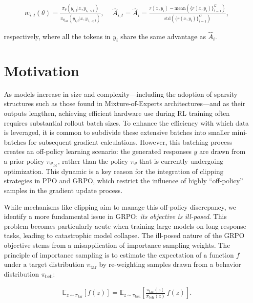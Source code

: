 \begin{align}
    w_{i,t}(\theta)=\frac{ \pi_{\theta} (y_{i,t} | x, y_{i,<t}) }{ \pi_{\theta_\text{old}} (y_{i,t} | x,y_{i,<t})},\quad\ 
    \widehat{A}_{i,t} = \widehat{A}_{i} = \frac{r(x, y_i) - \mathrm{mean} \left( \{ r(x, y_i) \}_{i=1}^G \right) }{ \mathrm{std} \left( \{ r(x, y_i) \}_{i=1}^G \right) },
\end{align}

respectively, where all the tokens in $y_i$ share the same advantage as $\widehat{A}_{i}$.

\section{Motivation}
\label{sec:motivation}

As models increase in size and complexity—including the adoption of sparsity structures such as those found in Mixture-of-Experts architectures—and as their outputs lengthen, achieving efficient hardware use during RL training often requires substantial rollout batch sizes. To enhance the efficiency with which data is leveraged, it is common to subdivide these extensive batches into smaller mini-batches for subsequent gradient calculations. However, this batching process creates an off-policy learning scenario: the generated responses $y$ are drawn from a prior policy $\pi_{\theta_\text{old}}$, rather than the policy $\pi_\theta$ that is currently undergoing optimization. This dynamic is a key reason for the integration of clipping strategies in PPO and GRPO, which restrict the influence of highly ``off-policy'' samples in the gradient update process.

While mechanisms like clipping aim to manage this off-policy discrepancy, we identify a more fundamental issue in GRPO: \textit{its objective is ill-posed}. This problem becomes particularly acute when training large models on long-response tasks, leading to catastrophic model collapse. The ill-posed nature of the GRPO objective stems from a misapplication of importance sampling weights. The principle of importance sampling is to estimate the expectation of a function $f$ under a target distribution $\pi_\text{tar}$ by re-weighting samples drawn from a behavior distribution $\pi_\text{beh}$:

\begin{align}
\mathbb{E}_{z \sim \pi_\text{tar}} \left[ f(z) \right] = \mathbb{E}_{z \sim \pi_\text{beh}} \left[ \frac{ \pi_\text{tar} (z) }{ \pi_\text{beh} (z)} \, f(z) \right].
\end{align}

